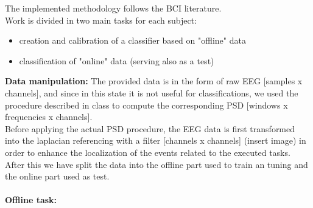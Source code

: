 The implemented methodology follows the BCI literature. \\
Work is divided in two main tasks for each subject: 
\begin{itemize}
\item creation and calibration of a classifier based on "offline" data
\item classification of "online" data (serving also as a test)
\end{itemize}\noindent
{\Large \textbf{Data manipulation:}}
The provided data is in the form of raw EEG [samples x channels], and since in this state it is not useful for classifications, we used the procedure described in class to compute the corresponding PSD [windows x frequencies x channels].\\
Before applying the actual PSD procedure, the EEG data is first transformed into the laplacian referencing with a filter [channels x channels] (insert image) in order to enhance the localization of the events related to the executed tasks.\\
After this we have split the data into the offline part used to train an tuning and the online part used as test.\\ \\
{\Large \textbf{Offline task:}}
